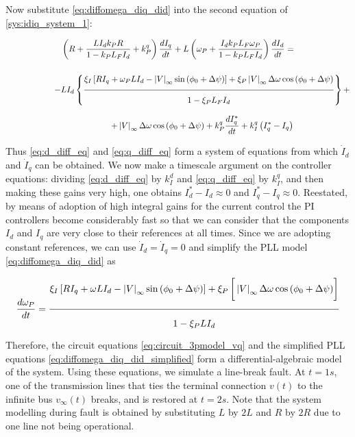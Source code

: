 \begin{example}
        Now substitute \eqref{eq:diffomega_diq_did} into the second equation of \eqref{sys:idiq_system_1}:

\begin{gather}
\left(R + \dfrac{LI_dk_PR}{1-k_PL_FI_d} + k_P^q \right)\dfrac{dI_q}{dt} + L\left(\omega_P + \dfrac{I_dk_PL_F\omega_P}{1-k_PL_FI_d}\right)\dfrac{dI_d}{dt} = \nonumber\\[5mm]
%
\hspace{20mm}-LI_d\left\{\xfrac{2mm}{2mm}{\xi_I\left[ RI_q + \omega_P L I_d - \left|V\right|_\infty\sin\left(\phi_0+\Delta\psi\right)\right] + \xi_P\left|V\right|_\infty\Delta\omega \cos\left(\phi_0+\Delta\psi\right)}{1-\xi_PL_FI_d}\right\} + \nonumber\\[3mm] \hspace{20mm} + \left|V\right|_\infty\Delta\omega\cos\left(\phi_0+\Delta\psi\right) + k_P^q\dfrac{dI_q^*}{dt} + k_I^q\left(I_q^* - I_q\right) \label{eq:q_diff_eq}
\end{gather}

	Thus \eqref{eq:d_diff_eq} and \eqref{eq:q_diff_eq} form a system of equations from which $\dot{I}_d$ and $\dot{I}_q$ can be obtained. We now make a timescale argument on the controller equations: dividing \eqref{eq:d_diff_eq} by $k_I^d$ and \eqref{eq:q_diff_eq} by $k_I^q$, and then making these gains very high, one obtains $I_d^* - I_d \approx 0$ and $I_q^* - I_q \approx 0$. Reestated, by means of adoption of high integral gains for the current control the PI controllers become considerably fast so that we can consider that the components $I_d$ and $I_q$ are very close to their references at all times. Since we are adopting constant references, we can use $\dot{I}_d = \dot{I}_q = 0$ and simplify the PLL model \eqref{eq:diffomega_diq_did} as

\begin{equation} \dfrac{d\omega_P}{dt} = \xfrac{5mm}{3mm}{\xi_I\left[ RI_q + \omega L I_d - \left|V\right|_\infty\sin\left(\phi_0+\Delta\psi\right)\right] + \xi_P\left[\raisebox{5mm}{} \left|V\right|_\infty\Delta\omega \cos\left(\phi_0 + \Delta\psi\right) \right]}{1-\xi_PLI_d} \label{eq:diffomega_diq_did_simplified} \end{equation}

	Therefore, the circuit equations \eqref{eq:circuit_3pmodel_vq} and the simplified PLL equations \eqref{eq:diffomega_diq_did_simplified} form a differential-algebraic model of the system. Using these equations, we simulate a line-break fault. At $t=1s$, one of the transmission lines that ties the terminal connection $v(t)$ to the infinite bus $v_\infty(t)$ breaks, and is restored at $t=2s$. Note that the system modelling during fault is obtained by substituting $L$ by $2L$ and $R$ by $2R$ due to one line not being operational.


\end{example}
